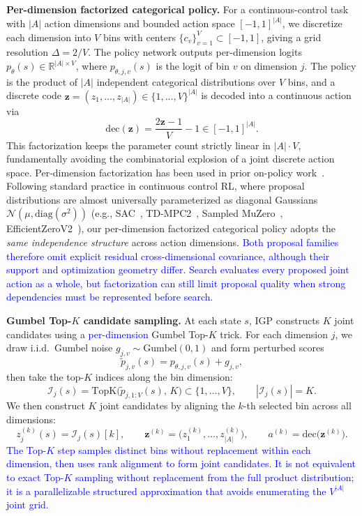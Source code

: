 \textbf{Per-dimension factorized categorical policy.}
For a continuous-control task with $|A|$ action dimensions and bounded action space $[-1,1]^{|A|}$, we discretize each dimension into $V$ bins with centers $\{c_v\}_{v=1}^{V}\subset[-1,1]$, giving a grid resolution $\Delta=2/V$. The policy network outputs per-dimension logits $p_\theta(s)\in\mathbb{R}^{|A|\times V}$, where $p_{\theta,j,v}(s)$ is the logit of bin $v$ on dimension $j$. The policy is the product of $|A|$ independent categorical distributions over $V$ bins, and a discrete code $\mathbf z=(z_1,\ldots,z_{|A|})\in\{1,\ldots,V\}^{|A|}$ is decoded into a continuous action via
\begin{equation}
    \mathrm{dec}(\mathbf z) = \frac{2\mathbf z - 1}{V} - 1 \in [-1,1]^{|A|}.
\end{equation}
This factorization keeps the parameter count strictly linear in $|A|\cdot V$, fundamentally avoiding the combinatorial explosion of a joint discrete action space. Per-dimension factorization has been used in prior on-policy work~\citep{tang2020discretizing}. Following standard practice in continuous control RL, where proposal distributions are almost universally parameterized as diagonal Gaussians $\mathcal{N}(\mu,\mathrm{diag}(\sigma^2))$ (e.g., SAC~\citep{haarnoja2018soft}, TD-MPC2~\citep{hansen2023td}, Sampled MuZero~\citep{hubert2021learning}, EfficientZeroV2~\citep{wang2024efficientzero}), our per-dimension factorized categorical policy adopts the \emph{same independence structure} across action dimensions. \textcolor{blue}{Both proposal families therefore omit explicit residual cross-dimensional covariance, although their support and optimization geometry differ. Search evaluates every proposed joint action as a whole, but factorization can still limit proposal quality when strong dependencies must be represented before search.}

\textbf{Gumbel Top-$K$ candidate sampling.}
At each state $s$, IGP constructs $K$ joint candidates using a \textcolor{blue}{per-dimension} Gumbel Top-$K$ trick. For each dimension $j$, we draw i.i.d.\ Gumbel noise $g_{j,v}\sim\mathrm{Gumbel}(0,1)$ and form perturbed scores
\begin{equation}
\tilde p_{j,v}(s)=p_{\theta,j,v}(s) + g_{j,v},
\end{equation}
then take the top-$K$ indices along the bin dimension:
\begin{equation}
\mathcal I_j(s)=\mathrm{TopK}\!\big(\tilde p_{j,1:V}(s),\,K\big)\subset\{1,\ldots,V\},
\qquad |\mathcal I_j(s)|=K.
\end{equation}
We then construct $K$ joint candidates by aligning the $k$-th selected bin across all dimensions:
\begin{equation}
z^{(k)}_j(s)=\mathcal I_j(s)[k],
\qquad
\mathbf z^{(k)}=\big(z^{(k)}_1,\ldots,z^{(k)}_{|A|}\big),
\qquad
a^{(k)}=\mathrm{dec}\big(\mathbf z^{(k)}\big).
\end{equation}
\textcolor{blue}{The Top-$K$ step samples distinct bins without replacement within each dimension, then uses rank alignment to form joint candidates. It is not equivalent to exact Top-$K$ sampling without replacement from the full product distribution; it is a parallelizable structured approximation that avoids enumerating the $V^{|A|}$ joint grid.}

